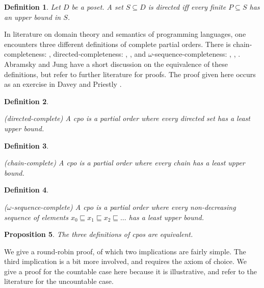 \documentclass[a4paper]{article}
\newcommand{\below}{\sqsubseteq}
\newtheorem{definition}{Definition}[section]
\newtheorem{proposition}[definition]{Proposition}
\begin{document}
\begin{definition}

Let $D$ be a poset. A set $S \subseteq D$ is \emph{directed} iff every finite
$P \subseteq S$ has an upper bound in $S$.

\end{definition}


In literature on domain theory and semantics of programming languages, one
encounters three different definitions of complete partial orders.  There is
chain-completeness: \cite{Moschovakis1994}, directed-completeness:
\cite{DaveyPriestly1990}, \cite{Gunter1992}, and $\omega$-sequence-completeness:
\cite{Allison1986}, \cite{Winskel1993}, \cite{BarrWells1990}. Abramsky and Jung
\cite{Abramsky1994} have a short discussion on the equivalence of these
definitions, but refer to further literature for proofs. The proof given here
occurs as an exercise in Davey and Priestly \cite{DaveyPriestly1990}.


\begin{definition} \label{defCpoDirectedComplete}

(directed-complete) A \emph{cpo} is a partial order where every directed set has
a least upper bound.

\end{definition}


\begin{definition} \label{defCpoChainComplete}

(chain-complete) A \emph{cpo} is a partial order where every chain has a least
upper bound.

\end{definition}


\begin{definition} \label{defCpoOmegaSequenceComplete}

($\omega$-sequence-complete) A \emph{cpo} is a partial order where every
non-decreasing sequence of elements $x_0 \below x_1 \below x_2 \below \ldots $
has a least upper bound.

\end{definition}


\begin{proposition}

The three definitions of cpos are equivalent.

\end{proposition}


We give a round-robin proof, of which two implications are fairly simple. The
third implication is a bit more involved, and requires the axiom of choice. We
give a proof for the countable case here because it is illustrative, and refer
to the literature for the uncountable case.
\end{document}
